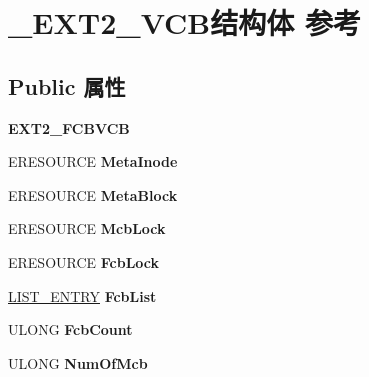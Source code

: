 \hypertarget{struct___e_x_t2___v_c_b}{}\section{\+\_\+\+E\+X\+T2\+\_\+\+V\+C\+B结构体 参考}
\label{struct___e_x_t2___v_c_b}
\subsection*{Public 属性}
\begin{DoxyCompactItemize}
\item 
\mbox{\label{struct___e_x_t2___v_c_b_a72fd60731007918269937811e440eb18}} 
{\bfseries E\+X\+T2\+\_\+\+F\+C\+B\+V\+CB}
\item 
\mbox{\label{struct___e_x_t2___v_c_b_ab1e540aca971e54fd975b06acdbc662c}} 
E\+R\+E\+S\+O\+U\+R\+CE {\bfseries Meta\+Inode}
\item 
\mbox{\label{struct___e_x_t2___v_c_b_ae97a787c7b68d0f2290e6865ecacf5f5}} 
E\+R\+E\+S\+O\+U\+R\+CE {\bfseries Meta\+Block}
\item 
\mbox{\label{struct___e_x_t2___v_c_b_a9e32b7d40f35c6b3cff8acb1b764bad6}} 
E\+R\+E\+S\+O\+U\+R\+CE {\bfseries Mcb\+Lock}
\item 
\mbox{\label{struct___e_x_t2___v_c_b_aaf58ec323683cbd43f6e5655124d3875}} 
E\+R\+E\+S\+O\+U\+R\+CE {\bfseries Fcb\+Lock}
\item 
\mbox{\label{struct___e_x_t2___v_c_b_a505fed6bfd9dd3a5d2554c4a06881605}} 
\hyperlink{struct___l_i_s_t___e_n_t_r_y}{L\+I\+S\+T\+\_\+\+E\+N\+T\+RY} {\bfseries Fcb\+List}
\item 
\mbox{\label{struct___e_x_t2___v_c_b_a78314301e4547853a7df0c87564cad2d}} 
U\+L\+O\+NG {\bfseries Fcb\+Count}
\item 
\mbox{\label{struct___e_x_t2___v_c_b_ab3b1f41bf7ae3865a65688cbdf56ec8f}} 
U\+L\+O\+NG {\bfseries Num\+Of\+Mcb}
\item 
\mbox{\label{struct___e_x_t2___v_c_b_af3617894b4c98395e092404b35fabae6}} 

\end{DoxyCompactItemize}
